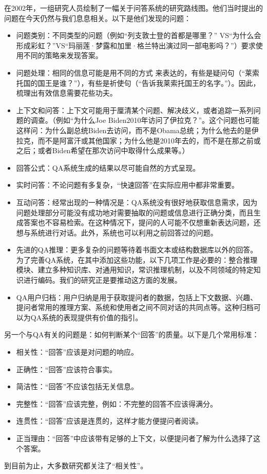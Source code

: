 在2002年，一组研究人员绘制了一幅关于问答系统的研究路线图\cite{Burger2002}。他们当时提出的问题在今天仍然与我们息息相关。以下是他们发现的问题：

\begin{itemize}
\item 问题类别：不同类型的问题（例如“列支敦士登的首都是哪里？” VS“为什么会形成彩虹？”VS“玛丽莲·梦露和加里·格兰特出演过同一部电影吗？”）要求使用不同的策略来发现答案。
\item 问题处理：相同的信息可能是用不同的方式 来表达的，有些是疑问句（“莱索托国的国王是谁？”），有些是祈使句（“告诉我莱索托国王的名字。”）。因此，梳理出有效信息需要花些功夫。
\item 上下文和问答：上下文可能用于厘清某个问题、解决歧义，或者追踪一系列问题的调查。（例如“为什么Joe Biden2010年访问了伊拉克？”。这个问题也可能这样问：为什么副总统Biden去访问，而不是Obama总统；为什么他去的是伊拉克，而不是阿富汗或其他国家；为什么他是2010年去的，而不是在那之前或之后；或者Biden希望在那次访问中取得什么成果等。）
\item 回答公式：QA系统生成的结果以尽可能自然的方式呈现。
\item 实时问答：不论问题有多复杂，“快速回答”在实际应用中都非常重要。
\item 互动问答：经常出现的一种情况是：QA系统没有很好地获取信息需求，因为问题处理部分可能没有成功地对需要抽取的问题或信息进行正确分类，而且生成答案也不容易检索。在这种情况下，提问的人可能不仅想重新表达问题，还想与系统进行对话。此外，系统也可以利用之前回答过的问题。
\item 先进的QA推理：更多复杂的问题等待着书面文本或结构数据库以外的回答。为了完善QA系统，在其中添加这些功能，以下几项工作是必要的：整合推理模块、建立多种知识库、对通用知识，常识推理机制，以及不同领域的特定知识进行编码。我们的研究正是要推动这方面的发展。
\item QA用户归档：用户归纳是用于获取提问者的数据，包括上下文数据、兴趣、提问者常用的推理方案、系统和使用者之间不同对话的共同点等。这种归档可以为QA系统的表现提供有价值的指引。
\end{itemize}

另一个与QA有关的问题是：如何判断某个“回答”的质量。以下是几个常用标准：

\begin{itemize}
\item 相关性：“回答”应该是对问题的响应。
\item 正确性：“回答”应该符合事实。
\item 简洁性：“回答”不应该包括无关信息。
\item 完整性：“回答”应该完整，例如：不完整的回答不应该得满分。
\item 连贯性：“回答”应该是连贯的，这样才能方便提问者阅读。
\item 正当理由：“回答”中应该带有足够的上下文，以便提问者了解为什么选择了这个答案。
\end{itemize}

到目前为止，大多数研究都关注了“相关性”。